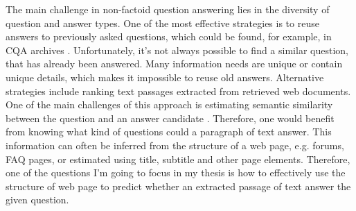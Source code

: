 
The main challenge in non-factoid question answering lies in the diversity of question and answer types.
One of the most effective strategies is to reuse answers to previously asked questions, which could be found, for example, in CQA archives \cite{Shtok:2012:LPA:2187836.2187939}.
Unfortunately, it's not always possible to find a similar question, that has already been answered.
Many information needs are unique or contain unique details, which makes it impossible to reuse old answers.
Alternative strategies include ranking text passages extracted from retrieved web documents.
One of the main challenges of this approach is estimating semantic similarity between the question and an answer candidate \cite{soricut2006automatic}.
Therefore, one would benefit from knowing what kind of questions could a paragraph of text answer.
This information can often be inferred from the structure of a web page, e.g. forums, FAQ pages, or estimated using title, subtitle and other page elements.
Therefore, one of the questions I'm going to focus in my thesis is how to effectively use the structure of web page to predict whether an extracted passage of text answer the given question.

